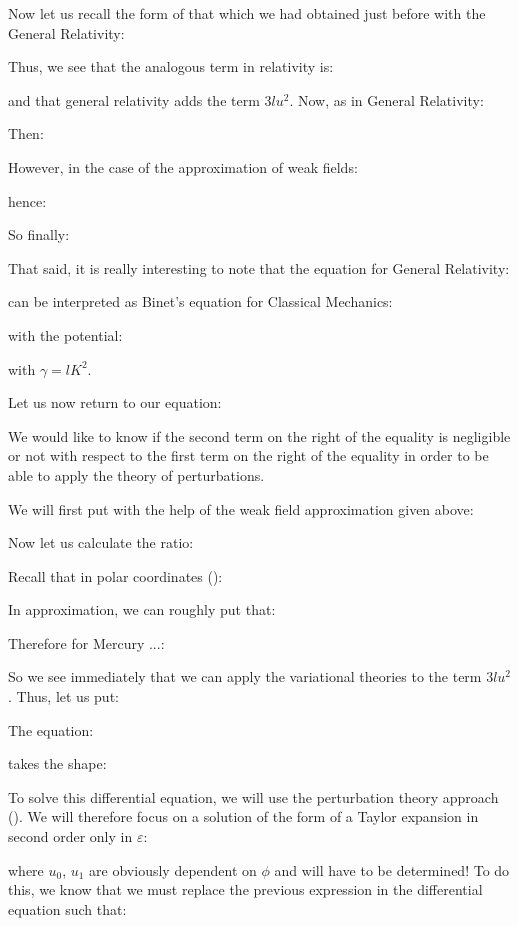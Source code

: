 	Now let us recall the form of that which we had obtained just before with the General Relativity:
	
	Thus, we see that the analogous term in relativity is:
	
	and that general relativity adds the term $3lu^2$. Now, as in General Relativity:
	
	Then:
	
	However, in the case of the approximation of weak fields:
	
	hence:
	
	So finally:
	
	That said, it is really interesting to note that the equation for General Relativity:
	
	can be interpreted as Binet's equation for Classical Mechanics:
	
	with the potential:
	
	with $\gamma=lK^2$.
	
	Let us now return to our equation:
	
	We would like to know if the second term on the right of the equality is negligible or not with respect to the first term on the right of the equality in order to be able to apply the theory of perturbations.

	We will first put with the help of the weak field approximation given above:
	
	Now let us calculate the ratio:
	
	Recall that in polar coordinates ():
	
	In approximation, we can roughly put that:
	
	Therefore for Mercury ...:
	
	So we see immediately that we can apply the variational theories to the term $3lu^2$. Thus, let us put:
	
	The equation:
	
	takes the shape:
	
	To solve this differential equation, we will use the perturbation theory approach (). We will therefore focus on a solution of the form of a Taylor expansion in second order only in $\varepsilon$:
	
	where $u_0$, $u_1$ are obviously dependent on $\phi$ and will have to be determined! To do this, we know that we must replace the previous expression in the differential equation such that:
	
